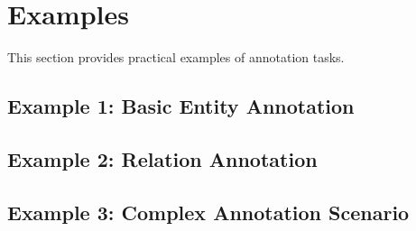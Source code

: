 
\section{Examples}

This section provides practical examples of annotation tasks.

\subsection{Example 1: Basic Entity Annotation}


\subsection{Example 2: Relation Annotation}


\subsection{Example 3: Complex Annotation Scenario}

